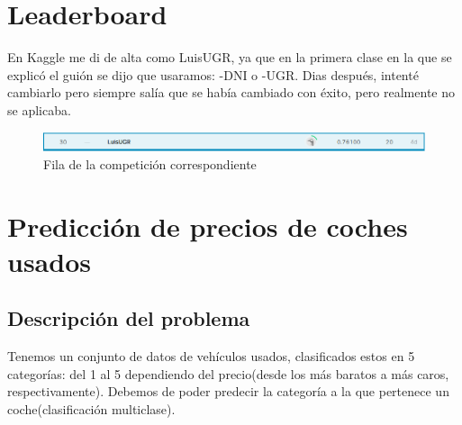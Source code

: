\section{Leaderboard}

En Kaggle me di de alta como LuisUGR, ya que en la primera clase en la que se explicó el guión se dijo que usaramos: -DNI o -UGR. Dias después, intenté cambiarlo pero siempre salía que se había cambiado con éxito, pero realmente no se aplicaba.

\begin{figure}[H]
\centering
\includegraphics[width=\textwidth]{imagenes/leaderboard.png}
\caption{Fila de la competición correspondiente}
\end{figure}

\section{Predicción de precios de coches usados}

\subsection{Descripción del problema}

Tenemos un conjunto de datos de vehículos usados, clasificados estos en 5 categorías: del 1 al 5 dependiendo del precio(desde los más baratos a más caros, respectivamente). Debemos de poder predecir la categoría a la que pertenece un coche(clasificación multiclase).


